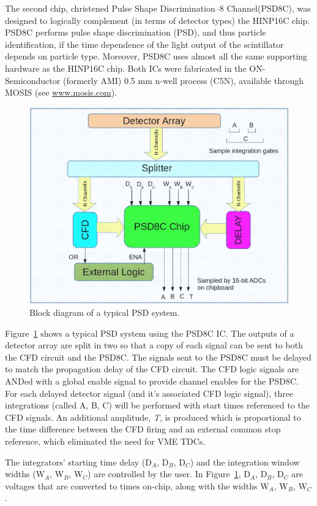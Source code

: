 \documentclass[12pt,oneside,final]{siuethesis}
\theoremstyle{definition}
\begin{document}
The second chip, christened Pulse Shape Discrimination--8 Channel(PSD8C), was designed to logically complement (in terms of detector types) the HINP16C chip. PSD8C performs pulse shape discrimination (PSD), and thus particle identification, if the time dependence of the light output of the scintillator depends on particle type. Moreover, PSD8C uses almost all the same supporting hardware as the HINP16C chip. Both ICs were fabricated in the ON-Semiconductor (formerly AMI) 0.5 mm n-well process (C5N), available through MOSIS (see \url{www.mosis.com}).

\begin{figure}[htbp!]
	\centering
 	\includegraphics[scale=0.6,keepaspectratio=true]{./ch1_figures/PSD_block.png}
 	\caption{Block diagram of a typical PSD system.}
 	\label{FIG:PSD_BLOCK}
\end{figure}

\par Figure~\ref{FIG:PSD_BLOCK} shows a typical PSD system using the PSD8C IC. The outputs of a detector array are split in two so that a copy of each signal can be sent to both the CFD circuit and the PSD8C. The signals sent to the PSD8C must be delayed to match the propagation delay of the CFD circuit. The CFD logic signals are ANDed with a global enable signal to provide channel enables for the PSD8C. For each delayed detector signal (and it's associated CFD logic signal), three integrations (called A, B, C) will be performed with start times referenced to the CFD signals. An additional amplitude, \emph{T}, is produced which is proportional to the time difference between the CFD firing and an external common stop reference, which eliminated the need for VME TDCs.
\par The integrators' starting time delay (D$_{A}$, D$_{B}$, D$_{C}$) and the integration window widths (W$_{A}$, W$_{B}$, W$_{C}$) are controlled by the user. In Figure~\ref{FIG:PSD_BLOCK}, D$_{A}$, D$_{B}$, D$_{C}$ are voltages that are converted to times on-chip, along with the widths W$_{A}$, W$_{B}$, W$_{C}$.
\end{document}
